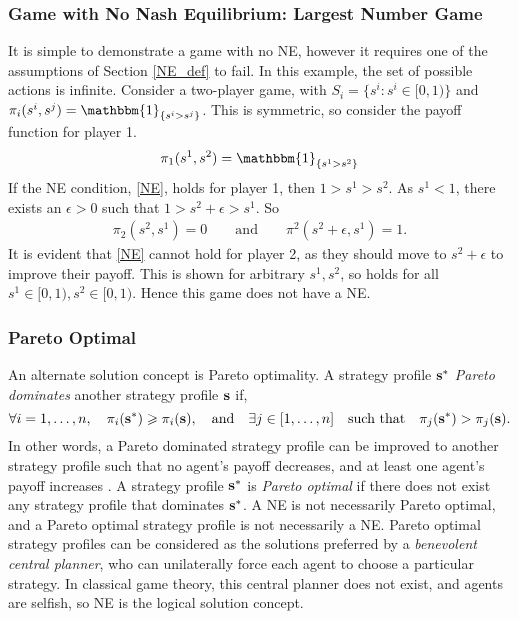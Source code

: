 \subsubsection{Game with No Nash Equilibrium: Largest Number Game}
It is simple to demonstrate a game with no NE, however it requires one of the assumptions of Section \ref{NE_def} to fail. In this example, the set of possible actions is infinite. Consider a two-player game, with $S_i = \{s^i: s^i \in [0,1) \}$ and $\pi_i(s^i,s^j) = \mathbbm{1}_{\{s^i>s^j\}}$. This is symmetric, so consider the payoff function for player 1. 
\begin{align*}
    \pi_1(s^1,s^2) = \mathbbm{1}_{\{s^1>s^2\}}
\end{align*}
If the NE condition, \eqref{NE}, holds for player 1, then $1>s^1 >s^2$. As $s^1<1$, there exists an $\epsilon>0$ such that $1>s^2 + \epsilon>s^1$. So 
\begin{align*}
    \pi_2(s^2,s^1) = 0 \qquad \text{and} \qquad \pi^2(s^2 + \epsilon,s^1) = 1.
\end{align*}
It is evident that \eqref{NE} cannot hold for player 2, as they should move to $s^2 + \epsilon$ to improve their payoff. This is shown for arbitrary $s^1, s^2$, so holds for all $s^1 \in [0,1), s^2 \in [0,1)$. Hence this game does not have a NE. 

\subsubsection{Pareto Optimal}
An alternate solution concept is Pareto optimality. A strategy profile $\mathbf{s}^*$ \emph{Pareto dominates} another strategy profile $\mathbf{s}$ if, $$\forall i=1,\dots,n, \quad \pi_i(\mathbf{s}^*)\geqslant \pi_i(\mathbf{s}), \quad  \text{and} \quad  \exists  j\in [1,\dots,n] \quad \text{such that} \quad \pi_j(\mathbf{s}^*)>\pi_j(\mathbf{s}).$$ In other words, a Pareto dominated strategy profile can be improved to another strategy profile such that no agent's payoff decreases, and at least one agent's payoff increases \cite{RN97}. A strategy profile $\mathbf{s}^*$ is \emph{Pareto optimal} if there does not exist any strategy profile that dominates $\mathbf{s}^*$. A NE is not necessarily Pareto optimal, and a Pareto optimal strategy profile is not necessarily a NE. Pareto optimal strategy profiles can be considered as the solutions preferred by a \emph{benevolent central planner}, who can unilaterally force each agent to choose a particular strategy. In classical game theory, this central planner does not exist, and agents are selfish, so NE is the logical solution concept. 


